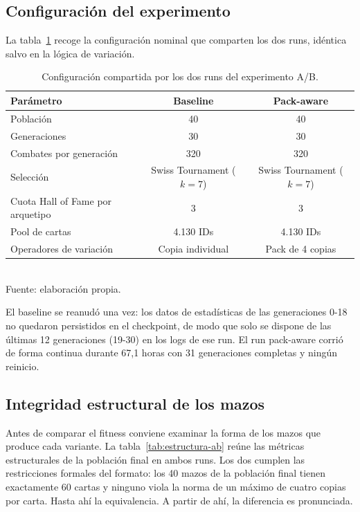 \subsection{Configuración del experimento}

La tabla~\ref{tab:config-ab} recoge la configuración nominal que comparten los dos runs, idéntica salvo en la lógica de variación.

\begin{table}[H]
\centering
\caption{Configuración compartida por los dos runs del experimento A/B.}
\label{tab:config-ab}
\begin{tabular}{lcc}
\toprule
\textbf{Parámetro} & \textbf{Baseline} & \textbf{Pack-aware} \\
\midrule
Población & 40 & 40 \\
Generaciones & 30 & 30 \\
Combates por generación & 320 & 320 \\
Selección & Swiss Tournament ($k=7$) & Swiss Tournament ($k=7$) \\
Cuota Hall of Fame por arquetipo & 3 & 3 \\
Pool de cartas & 4.130 IDs & 4.130 IDs \\
Operadores de variación & Copia individual & Pack de 4 copias \\
\bottomrule
\end{tabular}
\\[2pt]{\footnotesize Fuente: elaboración propia.}
\end{table}

El baseline se reanudó una vez: los datos de estadísticas de las generaciones 0-18 no quedaron persistidos en el checkpoint, de modo que solo se dispone de las últimas 12 generaciones (19-30) en los logs de ese run. El run pack-aware corrió de forma continua durante 67,1 horas con 31 generaciones completas y ningún reinicio.

\subsection{Integridad estructural de los mazos}

Antes de comparar el fitness conviene examinar la forma de los mazos que produce cada variante. La tabla~\ref{tab:estructura-ab} reúne las métricas estructurales de la población final en ambos runs. Los dos cumplen las restricciones formales del formato: los 40 mazos de la población final tienen exactamente 60 cartas y ninguno viola la norma de un máximo de cuatro copias por carta. Hasta ahí la equivalencia. A partir de ahí, la diferencia es pronunciada.

